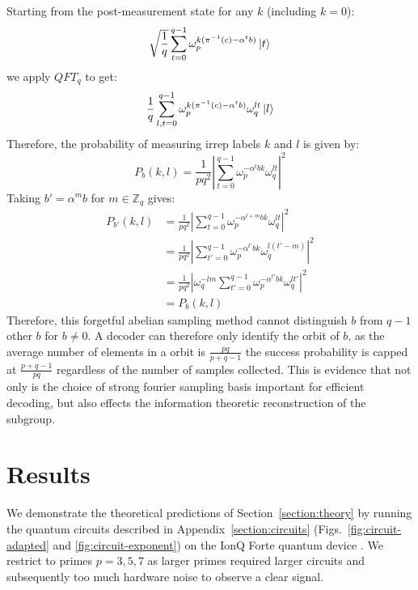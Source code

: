 \documentclass[aps,floatfix,10pt,amssymb,amsfont,amsmath,superscriptaddress,float,nofootinbib,longbibliography,nobalancelastpage,twocolumn]{revtex4-2}
\begin{document}
Starting from the post-measurement state for any $k$ (including $k=0$):
\begin{equation}
    \sqrt{\frac{1}{q}}\sum_{t=0}^{q-1} \omega_p^{k (\pi^{-1}(c) - \alpha^tb)}\ket{t}
\end{equation}
we apply $QFT_q$ to get:
\begin{equation}
        \frac{1}{q}\sum_{l,t=0}^{q-1} \omega_p^{k (\pi^{-1}(c) - \alpha^tb)}\omega_q^{lt}\ket{l}
\end{equation}
Therefore, the probability of measuring irrep labels $k$ and $l$ is given by:
\begin{equation}
    P_b(k,l) = \frac{1}{pq^2}\left| \sum_{t=0}^{q-1} \omega_p^{ - \alpha^tbk}\omega_q^{lt}\right|^2
\end{equation}
Taking $b'=\alpha^m b$ for $m \in \mathbb{Z}_q$ gives:
\begin{align}
     P_{b'}(k,l) &= \frac{1}{pq^2}\left| \sum_{t=0}^{q-1} \omega_p^{ - \alpha^{t+m}bk}\omega_q^{lt}\right|^2 \\
     &= \frac{1}{pq^2}\left| \sum_{t'=0}^{q-1} \omega_p^{ - \alpha^{t'}bk}\omega_q^{l(t'-m)}\right|^2\\
     &= \frac{1}{pq^2}\left| \omega_q^{-lm}\sum_{t'=0}^{q-1} \omega_p^{ - \alpha^{t'}bk}\omega_q^{lt'}\right|^2\\
     &= P_b(k,l)
\end{align}
Therefore, this forgetful abelian sampling method cannot distinguish $b$ from $q-1$ other $b$ for $b\neq 0$. A decoder can therefore only identify the orbit of $b$, as the average number of elements in a orbit is $\frac{pq}{p+q-1}$ the success probability is capped at $\frac{p+q-1}{pq}$ regardless of the number of samples collected. This is evidence that not only is the choice of strong fourier sampling basis important for efficient decoding, but also effects the information theoretic reconstruction of the subgroup.

\section{Results}
\label{section:results}




We demonstrate the theoretical predictions of Section~\ref{section:theory} by running the quantum circuits described in Appendix~\ref{section:circuits} (Figs.~\ref{fig:circuit-adapted} and \ref{fig:circuit-exponent}) on the IonQ Forte quantum device \cite{chen2024benchmarking}. We restrict to primes $p=3,5,7$ as larger primes required larger circuits and subsequently too much hardware noise to observe a clear signal.  
\end{document}
